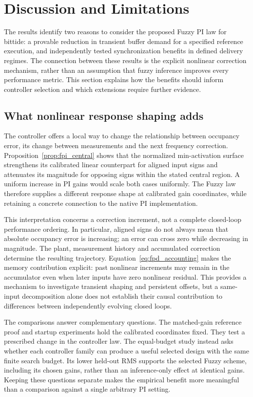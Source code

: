 \section{Discussion and Limitations}
\label{sec:discussion}

The results identify two reasons to consider the proposed Fuzzy PI law
for bittide: a provable reduction in transient buffer demand for a
specified reference execution, and independently tested synchronization
benefits in defined delivery regimes. The connection between these
results is the explicit nonlinear correction mechanism, rather than
an assumption that fuzzy inference improves every performance metric.
This section explains how the benefits should inform controller
selection and which extensions require further evidence.

\subsection{What nonlinear response shaping adds}
\label{subsec:discussion_mechanism}

The controller offers a local way to change the relationship between
occupancy error, its change between measurements and the next frequency
correction. Proposition~\ref{prop:fpi_central} shows that the normalized
min-activation surface strengthens its calibrated linear counterpart
for aligned input signs and attenuates its magnitude for opposing signs
within the stated central region. A uniform increase in PI gains would
scale both cases uniformly. The Fuzzy law therefore supplies
a different response shape at calibrated gain coordinates, while
retaining a concrete connection to the native PI implementation.

This interpretation concerns a correction increment, not a complete
closed-loop performance ordering. In particular, aligned signs do not
always mean that absolute occupancy error is increasing; an error can
cross zero while decreasing in magnitude. The plant, measurement
history and accumulated correction determine the resulting trajectory.
Equation~\eqref{eq:fpd_accounting} makes the memory contribution explicit:
past nonlinear increments may remain in the accumulator even when
later inputs have zero nonlinear residual. This provides a mechanism
to investigate transient shaping and persistent offsets, but a
same-input decomposition alone does not establish their causal
contribution to differences between independently evolving closed loops.

The comparisons answer complementary questions. The matched-gain
reference proof and startup experiments hold the calibrated coordinates
fixed. They test a prescribed change in the controller law. The
equal-budget study instead asks whether each controller family can
produce a useful selected design with the same finite search budget.
Its lower held-out RMS supports the selected Fuzzy scheme, including
its chosen gains, rather than an inference-only effect at identical
gains. Keeping these questions separate makes the empirical benefit
more meaningful than a comparison against a single arbitrary PI setting.

